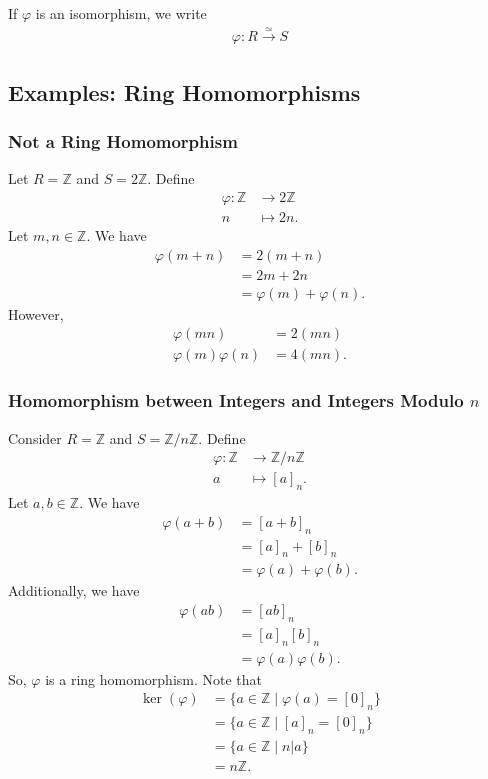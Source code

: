 \documentclass[10pt]{extarticle}
\newcommand{\Z}{\mathbb{Z}}
\begin{document}
  If $\varphi$ is an isomorphism, we write
  \begin{align*}
    \varphi: R\xrightarrow{\simeq}S
  \end{align*}
  \subsection{Examples: Ring Homomorphisms}%
  \subsubsection{Not a Ring Homomorphism}%
  Let $R = \Z$ and $S = 2\Z$. Define
  \begin{align*}
    \varphi: \Z&\rightarrow 2\Z\\
    n&\mapsto 2n.
  \end{align*}
  Let $m,n\in\Z$. We have
  \begin{align*}
    \varphi(m+n) &= 2(m+n)\\
                 &= 2m + 2n\\
                 &= \varphi(m) + \varphi(n).
  \end{align*}
  However,
  \begin{align*}
    \varphi(mn) &= 2(mn)\\
    \varphi(m)\varphi(n) &= 4(mn).
  \end{align*}
  \subsubsection{Homomorphism between Integers and Integers Modulo $n$}%
  Consider $R = \Z$ and $S = \Z/n\Z$. Define
  \begin{align*}
    \varphi:\Z&\rightarrow \Z/n\Z\\
    a&\mapsto [a]_{n}.
  \end{align*}
  Let $a,b\in\Z$. We have
  \begin{align*}
    \varphi(a+b) &= [a+b]_{n}\\
                 &= [a]_{n} + [b]_n\\
                 &= \varphi(a) + \varphi(b).
  \end{align*}
  Additionally, we have
  \begin{align*}
    \varphi(ab) &= [ab]_n\\
                &= [a]_n[b]_n\\
                &= \varphi(a)\varphi(b).
  \end{align*}
  So, $\varphi$ is a ring homomorphism. Note that
  \begin{align*}
    \ker(\varphi) &= \{a\in \Z\mid \varphi(a) = [0]_n\}\\
                  &= \{a\in \Z\mid [a]_n = [0]_n\}\\
                  &= \{a\in \Z\mid n | a\}\\
                  &= n\Z.
  \end{align*}
\end{document}
